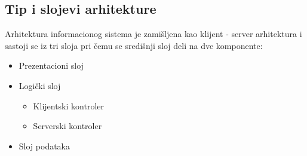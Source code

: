 \subsection{Tip i slojevi arhitekture}

Arhitektura informacionog sistema je zamišljena kao klijent - server arhitektura i sastoji se iz tri sloja pri čemu se središnji sloj deli na dve komponente: 
\begin{itemize}
    \item Prezentacioni sloj
    \item Logički sloj
    \begin{itemize}
        \item Klijentski kontroler 
        \item Serverski kontroler
    \end{itemize}
    \item Sloj podataka
\end{itemize}




